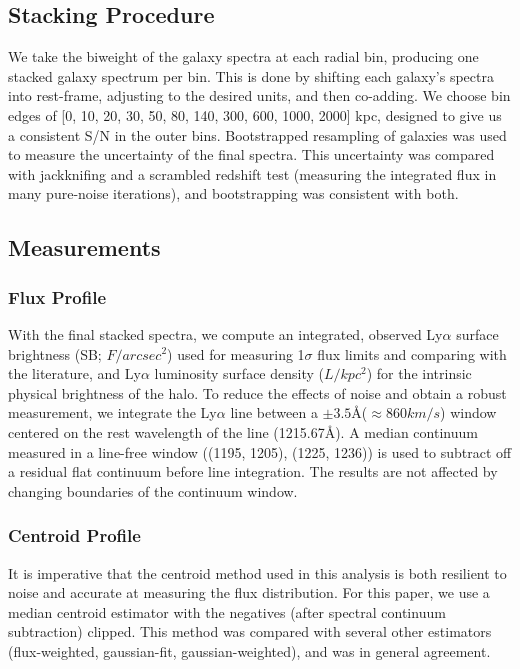 \documentclass[linenumbers,amsmath,trackchanges,preprint2]{aastex702}
\begin{document}
\subsection{Stacking Procedure}
\par We take the biweight of the galaxy spectra at each radial bin, producing one stacked galaxy spectrum per bin. This is done by shifting each galaxy's spectra into rest-frame, adjusting to the desired units, and then co-adding. We choose bin edges of [0, 10, 20, 30, 50, 80, 140, 300, 600, 1000, 2000] kpc, designed to give us a consistent S/N in the outer bins. Bootstrapped resampling of galaxies was used to measure the uncertainty of the final spectra. This uncertainty was compared with jackknifing and a scrambled redshift test (measuring the integrated flux in many pure-noise iterations), and bootstrapping was consistent with both.

\subsection{Measurements}
\subsubsection{Flux Profile}
\par With the final stacked spectra, we compute an integrated, observed Ly$\alpha$ surface brightness (SB; $F/arcsec^2$) used for measuring 1$\sigma$ flux limits and comparing with the literature, and Ly$\alpha$ luminosity surface density ($L/kpc^2$) for the intrinsic physical brightness of the halo. To reduce the effects of noise and obtain a robust measurement, we integrate the Ly$\alpha$ line between a $\pm3.5$\AA \xspace ($\approx860km/s$) window centered on the rest wavelength of the line (1215.67\AA). A median continuum measured in a line-free window ((1195, 1205), (1225, 1236)) is used to subtract off a residual flat continuum before line integration. The results are not affected by changing boundaries of the continuum window.

\subsubsection{Centroid Profile}
\par It is imperative that the centroid method used in this analysis is both resilient to noise and accurate at measuring the flux distribution. For this paper, we use a median centroid estimator with the negatives (after spectral continuum subtraction) clipped. This method was compared with several other estimators (flux-weighted, gaussian-fit, gaussian-weighted), and was in general agreement.
\end{document}
